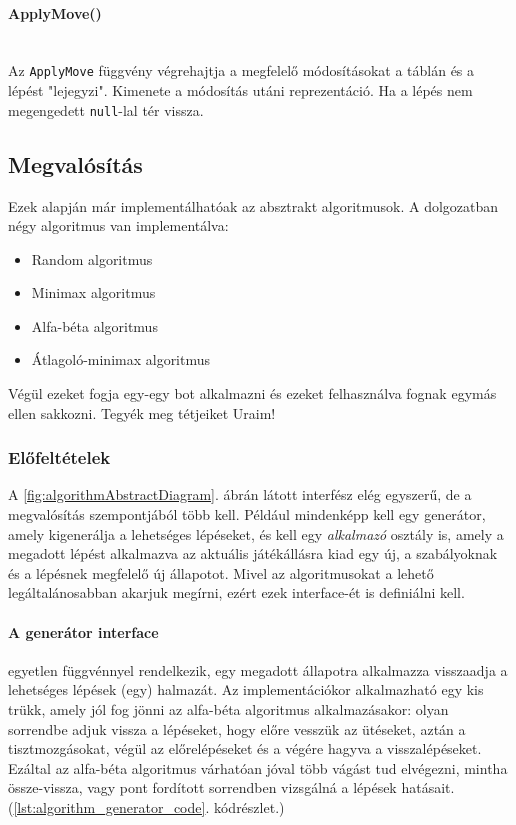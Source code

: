 \documentclass[twoside, a4paper, 12pt]{article}
\begin{document}
\paragraph{ApplyMove()} \mbox{} \\
Az \texttt{ApplyMove} függvény végrehajtja a megfelelő módosításokat a táblán és a lépést "lejegyzi". Kimenete a módosítás utáni reprezentáció. Ha a lépés nem megengedett \texttt{null}-lal tér vissza.






\newpage




\subsection{Megvalósítás}
Ezek alapján már implementálhatóak az absztrakt algoritmusok. A dolgozatban négy algoritmus van implementálva:
\begin{itemize}
	\item Random algoritmus
	\item Minimax algoritmus
	\item Alfa-béta algoritmus
	\item Átlagoló-minimax algoritmus
\end{itemize}

Végül ezeket fogja egy-egy bot alkalmazni és ezeket felhasználva fognak egymás ellen sakkozni. Tegyék meg tétjeiket Uraim!

\subsubsection{Előfeltételek}
A \ref{fig:algorithmAbstractDiagram}. ábrán látott interfész elég egyszerű, de a megvalósítás szempontjából több kell. Például mindenképp kell egy generátor, amely kigenerálja a lehetséges lépéseket, és kell egy \textit{alkalmazó} osztály is, amely a megadott lépést alkalmazva az aktuális játékállásra kiad egy új, a szabályoknak és a lépésnek megfelelő új állapotot. Mivel az algoritmusokat a lehető legáltalánosabban akarjuk megírni, ezért ezek interface-ét is definiálni kell.

\paragraph{A generátor interface} egyetlen függvénnyel rendelkezik, egy megadott állapotra alkalmazza visszaadja a lehetséges lépések (egy) halmazát. Az implementációkor alkalmazható egy kis trükk, amely jól fog jönni az alfa-béta algoritmus alkalmazásakor: olyan sorrendbe adjuk vissza a lépéseket, hogy előre vesszük az ütéseket, aztán a tisztmozgásokat, végül az előrelépéseket és a végére hagyva a visszalépéseket. Ezáltal az alfa-béta algoritmus várhatóan jóval több vágást tud elvégezni, mintha össze-vissza, vagy pont fordított sorrendben vizsgálná a lépések hatásait. (\ref{lst:algorithm_generator_code}. kódrészlet.)
\end{document}
